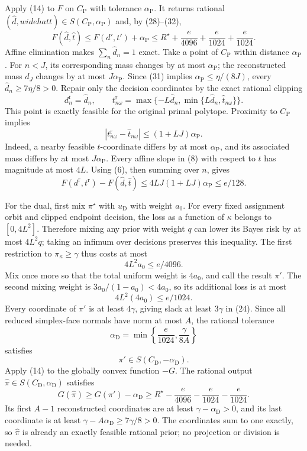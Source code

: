 Apply (14) to \(F\) on \(C_{\mathrm P}\) with tolerance \(\alpha_{\mathrm P}\).  It returns rational \((\widehat d,widehat t)\in S(C_{\mathrm P},\alpha_{\mathrm P})\) and, by (28)--(32),
\[
 F(\widehat d,\widehat t)
 \le F(d',t')+\alpha_{\mathrm P}
 \le R^\star+\frac e{4096}+\frac e{1024}+\frac e{1024}.
\tag{33}
\]
Affine elimination makes \(\sum_n\widehat d_n=1\) exact.  Take a point of \(C_{\mathrm P}\) within distance \(\alpha_{\mathrm P}\).  For \(n<J\), its corresponding mass changes by at most \(\alpha_{\mathrm P}\); the reconstructed mass \(d_J\) changes by at most \(J\alpha_{\mathrm P}\).  Since (31) implies \(\alpha_{\mathrm P}\le\eta/(8J)\), every \(\widehat d_n\ge7\eta/8>0\).  Repair only the decision coordinates by the exact rational clipping
\[
 d_n^{\mathrm r}=\widehat d_n,
 \qquad
 t_{n\omega}^{\mathrm r}
 =\max\{-L\widehat d_n,
          \min\{L\widehat d_n,\widehat t_{n\omega}\}\}.
\tag{34}
\]
This point is exactly feasible for the original primal polytope.  Proximity to \(C_{\mathrm P}\) implies
\[
 |t_{n\omega}^{\mathrm r}-\widehat t_{n\omega}|
 \le(1+LJ)\alpha_{\mathrm P}.
\tag{35}
\]
Indeed, a nearby feasible \(t\)-coordinate differs by at most \(\alpha_{\mathrm P}\), and its associated mass differs by at most \(J\alpha_{\mathrm P}\).  Every affine slope in (8) with respect to \(t\) has magnitude at most \(4L\).  Using (6), then summing over \(n\), gives
\[
 F(d^{\mathrm r},t^{\mathrm r})-F(\widehat d,\widehat t)
 \le4LJ(1+LJ)\alpha_{\mathrm P}
 \le e/128.
\tag{36}
\]

For the dual, first mix \(\pi^\star\) with \(u_{\mathrm D}\) with weight \(a_0\).  For every fixed assignment orbit and clipped endpoint decision, the loss as a function of \(\kappa\) belongs to \([0,4L^2]\).  Therefore mixing any prior with weight \(q\) can lower its Bayes risk by at most \(4L^2q\); taking an infimum over decisions preserves this inequality.  The first restriction to \(\pi_\kappa\ge\gamma\) thus costs at most
\[
 4L^2a_0\le e/4096.
\tag{37}
\]
Mix once more so that the total uniform weight is \(4a_0\), and call the result \(\pi'\).  The second mixing weight is \(3a_0/(1-a_0)<4a_0\), so its additional loss is at most
\[
 4L^2(4a_0)\le e/1024.
\tag{38}
\]
Every coordinate of \(\pi'\) is at least \(4\gamma\), giving slack at least \(3\gamma\) in (24).  Since all reduced simplex-face normals have norm at most \(A\), the rational tolerance
\[
 \alpha_{\mathrm D}=\min\left\{\frac e{1024},\frac{\gamma}{8A}\right\}
\tag{39}
\]
satisfies
\[
 \pi'\in S(C_{\mathrm D},-\alpha_{\mathrm D}).
\tag{40}
\]
Apply (14) to the globally convex function \(-G\).  The rational output \(\widehat\pi\in S(C_{\mathrm D},\alpha_{\mathrm D})\) satisfies
\[
 G(\widehat\pi)
 \ge G(\pi')-\alpha_{\mathrm D}
 \ge R^\star-\frac e{4096}-\frac e{1024}-\frac e{1024}.
\tag{41}
\]
Its first \(A-1\) reconstructed coordinates are at least \(\gamma-\alpha_{\mathrm D}>0\), and its last coordinate is at least \(\gamma-A\alpha_{\mathrm D}\ge7\gamma/8>0\).  The coordinates sum to one exactly, so \(\widehat\pi\) is already an exactly feasible rational prior; no projection or division is needed.


